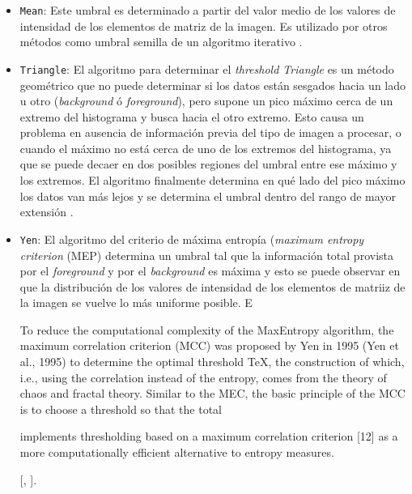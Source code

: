 \begin{itemize}
\item \texttt{Mean}: Este umbral es determinado a partir del valor medio de los valores de intensidad de los elementos de matriz de la imagen. Es utilizado por otros métodos como umbral semilla de un algoritmo iterativo \cite{GLASBEY}. 

\item \texttt{Triangle}: El algoritmo para determinar el \textit{threshold Triangle} es un método geométrico que no puede determinar si los datos están sesgados hacia un lado u otro (\textit{background} ó \textit{foreground}), pero supone un pico máximo cerca de un extremo del histograma y busca hacia el otro extremo. Esto causa un problema en ausencia de información previa del tipo de imagen a procesar, o cuando el máximo no está cerca de uno de los extremos del histograma, ya que se puede decaer en dos posibles regiones del umbral entre ese máximo y los extremos. El algoritmo finalmente determina en qué lado del pico máximo los datos van más lejos y se determina el umbral dentro del rango de mayor extensión \cite{triang}.

\item \texttt{Yen}: El algoritmo del criterio de máxima entropía (\textit{maximum entropy criterion} (MEP) determina un umbral tal que la información total provista por el \textit{foreground} y por el \textit{background} es máxima y esto se puede observar en que la distribución de los valores de intensidad de los elementos de matriiz de la imagen se vuelve lo más uniforme posible. E


To reduce the computational complexity of the MaxEntropy algorithm,
the maximum correlation criterion (MCC) was proposed by Yen
in 1995 (Yen et al., 1995) to determine the optimal threshold \TeX, the
construction of which, i.e., using the correlation instead of the entropy,
comes from the theory of chaos and fractal theory. Similar to the MEC,
the basic principle of the MCC is to choose a threshold so that the total

implements thresholding based on a maximum correlation criterion [12] as a more computationally efficient alternative to entropy measures.

[\cite{yen}, \cite{yen2}].

\end{itemize}


